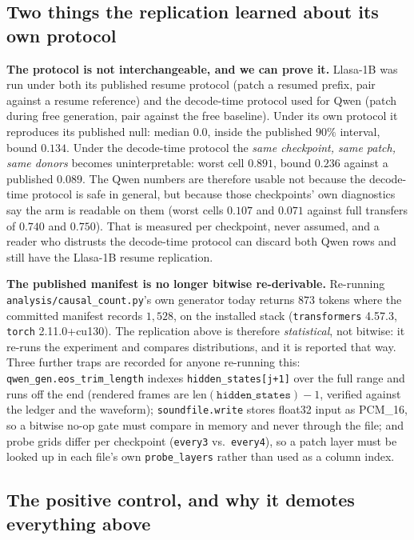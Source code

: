 \documentclass[11pt]{article}
\begin{document}
\subsection{Two things the replication learned about its own protocol}

\textbf{The protocol is not interchangeable, and we can prove it.} Llasa-1B was
run under both its published resume protocol (patch a resumed prefix, pair
against a resume reference) and the decode-time protocol used for Qwen (patch
during free generation, pair against the free baseline). Under its own protocol
it reproduces its published null: median $0.0$, inside the published $90\%$
interval, bound $0.134$. Under the decode-time protocol the \emph{same
checkpoint, same patch, same donors} becomes uninterpretable: worst cell
$0.891$, bound $0.236$ against a published $0.089$. The Qwen numbers are
therefore usable not because the decode-time protocol is safe in general, but
because those checkpoints' own diagnostics say the arm is readable on them
(worst cells $0.107$ and $0.071$ against full transfers of $0.740$ and $0.750$).
That is measured per checkpoint, never assumed, and a reader who distrusts the
decode-time protocol can discard both Qwen rows and still have the Llasa-1B
resume replication.

\textbf{The published manifest is no longer bitwise re-derivable.} Re-running
\texttt{analysis/causal\_count.py}'s own generator today returns $873$ tokens
where the committed manifest records $1{,}528$, on the installed stack
(\texttt{transformers} 4.57.3, \texttt{torch} 2.11.0+cu130). The replication
above is therefore \emph{statistical}, not bitwise: it re-runs the experiment
and compares distributions, and it is reported that way. Three further traps
are recorded for anyone re-running this: \texttt{qwen\_gen.eos\_trim\_length}
indexes \texttt{hidden\_states[j+1]} over the full range and runs off the end
(rendered frames are $\text{len}(\texttt{hidden\_states}){-}1$, verified against
the ledger and the waveform); \texttt{soundfile.write} stores float32 input as
PCM\_16, so a bitwise no-op gate must compare in memory and never through the
file; and probe grids differ per checkpoint (\texttt{every3} vs.\
\texttt{every4}), so a patch layer must be looked up in each file's own
\texttt{probe\_layers} rather than used as a column index.

\subsection{The positive control, and why it demotes everything above}
\end{document}
